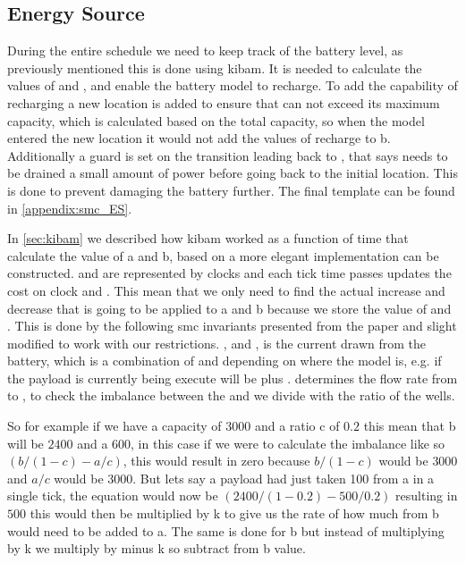 \subsection{Energy Source} \label{subsec:energy_src}
During the entire schedule we need to keep track of the battery level, as previously mentioned this is done using \gls{kibam}. It is needed to calculate the values of  and , and enable the battery model to recharge\cite{battery_aware_scheduling}. To add the capability of recharging a new location is added to ensure that  can not exceed its maximum capacity, which is calculated based on the total capacity, so when the model entered the new location it would not add the values of recharge to b. Additionally a guard is set on the transition leading back to , that says  needs to be drained a small amount of power before going back to the initial location. This is done to prevent damaging the battery further. The final template can be found in \cref{appendix:smc_ES}.

In \cref{sec:kibam} we described how \gls{kibam} worked as a function of time that calculate the value of a and b, based on \cite{battery_aware_scheduling} a more elegant implementation can be constructed. 
 and  are represented by clocks and each tick time passes updates the cost on clock  and . This mean that we only need to find the actual increase and decrease that is going to be applied to a and b because we store the value of  and . This is done by the following \gls{smc} invariants presented from the paper and slight modified to work with our restrictions. , and ,  is the current drawn from the battery, which is a combination of  and  depending on where the model is, e.g. if the payload is currently being execute  will be  plus .  determines the flow rate from  to , to check the imbalance between the  and  we divide with the ratio of the wells. 

So for example if we have a capacity of $3000$ and a ratio c of $0.2$ this mean that b will be $2400$ and a $600$, in this case if we were to calculate the imbalance like so $(b/(1-c)-a/c)$, this would result in zero because $b/(1-c)$ would be $3000$ and $a/c$ would be $3000$. But lets say a payload had just taken 100 from a in a single tick, the equation would now be $(2400/(1-0.2)-500/0.2)$ resulting in $500$ this would then be multiplied by k to give us the rate of how much from b would need to be added to a. The same is done for b but instead of multiplying by k we multiply by minus k so subtract from b value.

